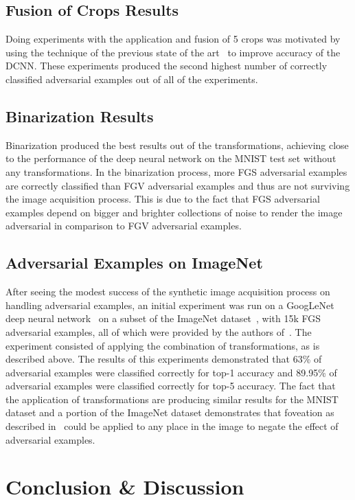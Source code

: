 \documentclass[conference]{IEEEtran}
\begin{document}
\subsection{Fusion of Crops Results}
Doing experiments with the application and fusion of 5 crops was motivated by using the technique of the previous state of the art~\cite{c18} to improve accuracy of the DCNN.  These experiments produced the second highest number of correctly classified adversarial examples out of all of the experiments.

\subsection{Binarization Results}
Binarization produced the best results out of the transformations, achieving close to the performance of the deep neural network on the MNIST test set without any transformations.  In the binarization process, more FGS adversarial examples are correctly classified than FGV adversarial examples and thus are not surviving the image acquisition process.  This is due to the fact that FGS adversarial examples depend on bigger and brighter collections of noise to render the image adversarial in comparison to FGV adversarial examples.  

\subsection{Adversarial Examples on ImageNet}
After seeing the modest success of the synthetic image acquisition process on handling adversarial examples, an initial experiment was run on a GoogLeNet deep neural network~\cite{c18} on a subset of the ImageNet dataset~\cite{c17}, with 15k FGS adversarial examples, all of which were provided by the authors of~\cite{c1}.  The experiment consisted of applying the combination of transformations, as is described above.  The results of this experiments demonstrated that 63\% of adversarial examples were classified correctly for top-1 accuracy and 89.95\% of adversarial examples were classified correctly for top-5 accuracy.  The fact that the application of transformations are producing similar results for the MNIST dataset and a portion of the ImageNet dataset demonstrates that foveation as described in~\cite{c15} could be applied to any place in the image to negate the effect of adversarial examples.

\section{Conclusion \& Discussion}
 
\end{document}
